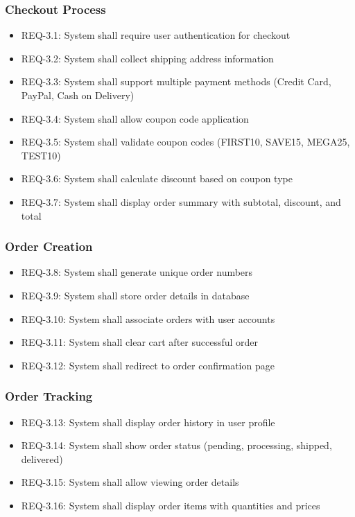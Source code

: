 \documentclass{scrreprt}
\begin{document}
\subsubsection{Checkout Process}
\begin{itemize}
\item REQ-3.1: System shall require user authentication for checkout
\item REQ-3.2: System shall collect shipping address information
\item REQ-3.3: System shall support multiple payment methods (Credit Card, PayPal, Cash on Delivery)
\item REQ-3.4: System shall allow coupon code application
\item REQ-3.5: System shall validate coupon codes (FIRST10, SAVE15, MEGA25, TEST10)
\item REQ-3.6: System shall calculate discount based on coupon type
\item REQ-3.7: System shall display order summary with subtotal, discount, and total
\end{itemize}

\subsubsection{Order Creation}
\begin{itemize}
\item REQ-3.8: System shall generate unique order numbers
\item REQ-3.9: System shall store order details in database
\item REQ-3.10: System shall associate orders with user accounts
\item REQ-3.11: System shall clear cart after successful order
\item REQ-3.12: System shall redirect to order confirmation page
\end{itemize}

\subsubsection{Order Tracking}
\begin{itemize}
\item REQ-3.13: System shall display order history in user profile
\item REQ-3.14: System shall show order status (pending, processing, shipped, delivered)
\item REQ-3.15: System shall allow viewing order details
\item REQ-3.16: System shall display order items with quantities and prices
\end{itemize}
\end{document}
